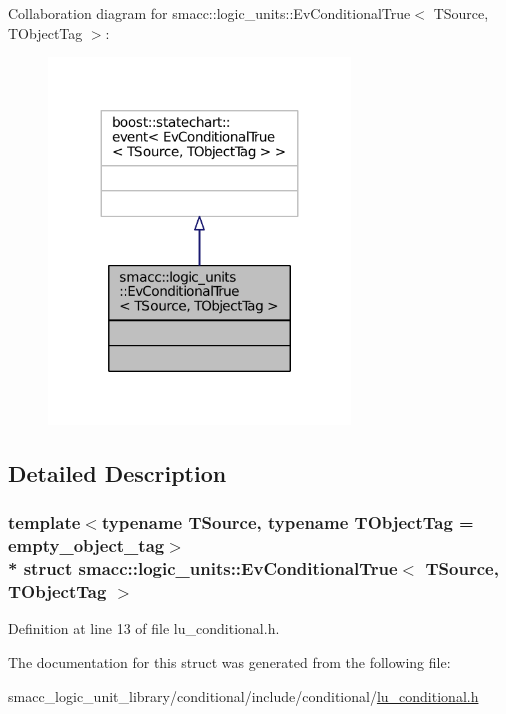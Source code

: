 Collaboration diagram for smacc\+:\+:logic\+\_\+units\+:\+:Ev\+Conditional\+True$<$ T\+Source, T\+Object\+Tag $>$\+:
\nopagebreak
\begin{figure}[H]
\begin{center}
\leavevmode
\includegraphics[width=227pt]{structsmacc_1_1logic__units_1_1EvConditionalTrue__coll__graph}
\end{center}
\end{figure}


\subsection{Detailed Description}
\subsubsection*{template$<$typename T\+Source, typename T\+Object\+Tag = empty\+\_\+object\+\_\+tag$>$\\*
struct smacc\+::logic\+\_\+units\+::\+Ev\+Conditional\+True$<$ T\+Source, T\+Object\+Tag $>$}



Definition at line 13 of file lu\+\_\+conditional.\+h.



The documentation for this struct was generated from the following file\+:\begin{DoxyCompactItemize}
\item 
smacc\+\_\+logic\+\_\+unit\+\_\+library/conditional/include/conditional/\hyperlink{lu__conditional_8h}{lu\+\_\+conditional.\+h}\end{DoxyCompactItemize}
